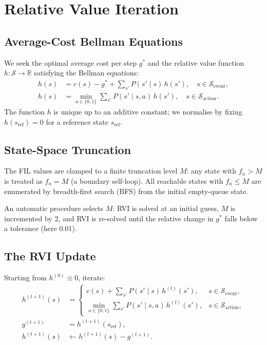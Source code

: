 \documentclass[11pt,a4paper]{article}
\begin{document}
\section{Relative Value Iteration}
\label{sec:rvi}

\subsection{Average-Cost Bellman Equations}

We seek the optimal average cost per step $g^*$ and the relative value
function $h : \mathcal{S} \to \mathbb{R}$ satisfying the Bellman equations:
\begin{align}
  h(s) &= c(s) - g^* + \sum_{s'} P(s' \mid s)\, h(s'),
         \quad s \in \mathcal{S}_\text{event},
  \label{eq:bell_event} \\[4pt]
  h(s) &= \min_{a \in \{0,1\}} \sum_{s'} P(s' \mid s, a)\, h(s'),
         \quad s \in \mathcal{S}_\text{action}.
  \label{eq:bell_action}
\end{align}
The function $h$ is unique up to an additive constant; we normalise by fixing
$h(s_\text{ref}) = 0$ for a reference state $s_\text{ref}$.

\subsection{State-Space Truncation}

The FIL values are clamped to a finite truncation level $M$: any state with
$f_n > M$ is treated as $f_n = M$ (a boundary self-loop).  All reachable states
with $f_n \leq M$ are enumerated by breadth-first search (BFS) from the initial
empty-queue state.

An automatic procedure selects $M$: RVI is solved at an initial guess,
$M$ is incremented by 2, and RVI is re-solved until the relative change in
$g^*$ falls below a tolerance (here 0.01).

\subsection{The RVI Update}

Starting from $h^{(0)} \equiv 0$, iterate:
\begin{align*}
  h^{(t+1)}(s) &=
  \begin{cases}
    c(s) + \displaystyle\sum_{s'} P(s' \mid s)\, h^{(t)}(s'),
      & s \in \mathcal{S}_\text{event}, \\[6pt]
    \displaystyle\min_{a \in \{0,1\}}
      \sum_{s'} P(s' \mid s, a)\, h^{(t)}(s'),
      & s \in \mathcal{S}_\text{action},
  \end{cases} \\[4pt]
  g^{(t+1)} &= h^{(t+1)}(s_\text{ref}), \\
  h^{(t+1)}(s) &\leftarrow h^{(t+1)}(s) - g^{(t+1)}.
\end{align*}
\end{document}
